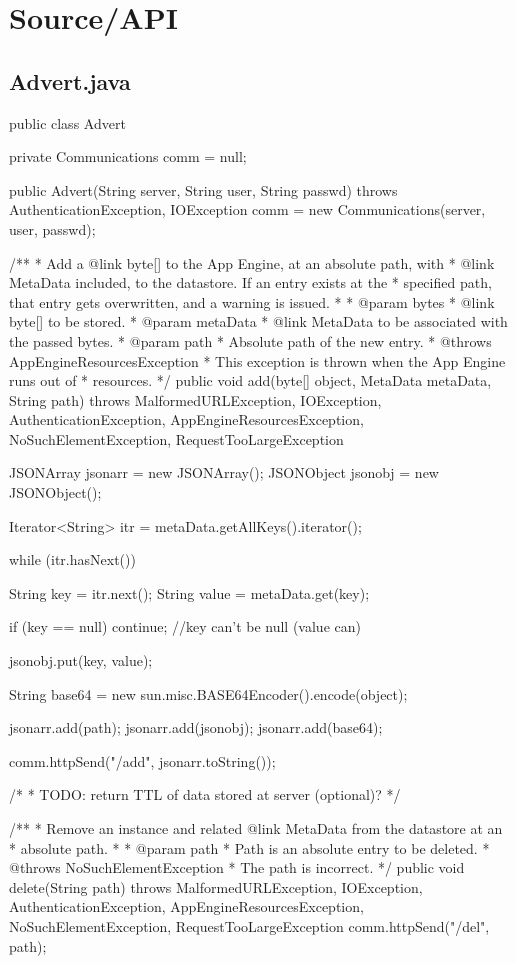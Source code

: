 \section{Source/API}
\subsection{Advert.java}
\begin{code}
public class Advert {
	
	private Communications comm = null;
	
	public Advert(String server, String user, String passwd) 
	  throws AuthenticationException, IOException {
		comm = new Communications(server, user, passwd);
	}
	
	/**
	 * Add a {@link byte}[] to the App Engine, at an absolute path, with
	 * {@link MetaData} included, to the datastore. If an entry exists at the
	 * specified path, that entry gets overwritten, and a warning is issued.
	 * 
	 * @param bytes
	 *            {@link byte}[] to be stored.
	 * @param metaData
	 *            {@link MetaData} to be associated with the passed bytes.
	 * @param path
	 *            Absolute path of the new entry.
	 * @throws AppEngineResourcesException
	 *             This exception is thrown when the App Engine runs out of
	 *             resources.
	 */
	public void add(byte[] object, MetaData metaData, String path) 
	  throws MalformedURLException, IOException, AuthenticationException,
	  AppEngineResourcesException, NoSuchElementException, 
	  RequestTooLargeException {
		JSONArray  jsonarr = new JSONArray();
		JSONObject jsonobj = new JSONObject();

		Iterator<String> itr  = metaData.getAllKeys().iterator();
	
		while (itr.hasNext()) {
			String key   = itr.next();
			String value = metaData.get(key);

			if (key == null) {
				continue; //key can't be null (value can)
			}
			
			jsonobj.put(key, value);
		}
		
		String base64 = new sun.misc.BASE64Encoder().encode(object);
		
		jsonarr.add(path);
		jsonarr.add(jsonobj);
		jsonarr.add(base64);
		
		comm.httpSend("/add", jsonarr.toString());
		
        /*
         * TODO: return TTL of data stored at server (optional)?
         */
	}
	

	/**
	 * Remove an instance and related {@link MetaData} from the datastore at an
	 * absolute path.
	 * 
	 * @param path
	 *            Path is an absolute entry to be deleted.
	 * @throws NoSuchElementException
	 *             The path is incorrect.
	 */
	public void delete(String path) 
	  throws MalformedURLException, IOException, AuthenticationException,
	  AppEngineResourcesException, NoSuchElementException, 
	  RequestTooLargeException {
		comm.httpSend("/del", path);
	}

}
\end{code}
